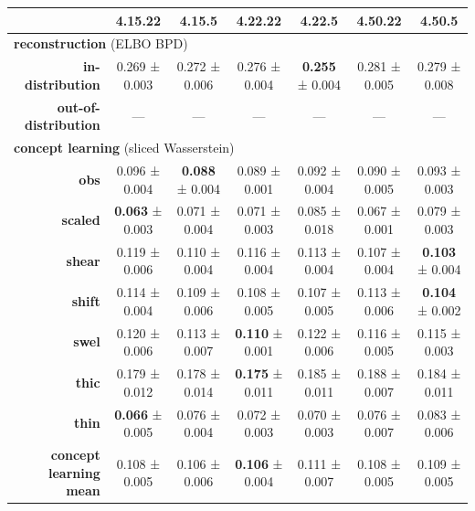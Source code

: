 \begin{tabular}{rcccccc}
\toprule
& \textbf{4.15.22} & \textbf{4.15.5} & \textbf{4.22.22} & \textbf{4.22.5} & \textbf{4.50.22} & \textbf{4.50.5} \\
\midrule
\multicolumn{ 7 }{l}{\textbf{reconstruction}  (ELBO BPD)} \\
\midrule
\textbf{in-distribution} & 0.269 ± 0.003 & 0.272 ± 0.006 & 0.276 ± 0.004 & \textbf{0.255} ± 0.004 & 0.281 ± 0.005 & 0.279 ± 0.008 \\
\textbf{out-of-distribution} & --- & --- & --- & --- & --- & --- \\
\midrule
\multicolumn{ 7 }{l}{\textbf{concept learning}  (sliced Wasserstein)} \\
\midrule
\textbf{obs} & 0.096 ± 0.004 & \textbf{0.088} ± 0.004 & 0.089 ± 0.001 & 0.092 ± 0.004 & 0.090 ± 0.005 & 0.093 ± 0.003 \\
\textbf{scaled} & \textbf{0.063} ± 0.003 & 0.071 ± 0.004 & 0.071 ± 0.003 & 0.085 ± 0.018 & 0.067 ± 0.001 & 0.079 ± 0.003 \\
\textbf{shear} & 0.119 ± 0.006 & 0.110 ± 0.004 & 0.116 ± 0.004 & 0.113 ± 0.004 & 0.107 ± 0.004 & \textbf{0.103} ± 0.004 \\
\textbf{shift} & 0.114 ± 0.004 & 0.109 ± 0.006 & 0.108 ± 0.005 & 0.107 ± 0.005 & 0.113 ± 0.006 & \textbf{0.104} ± 0.002 \\
\textbf{swel} & 0.120 ± 0.006 & 0.113 ± 0.007 & \textbf{0.110} ± 0.001 & 0.122 ± 0.006 & 0.116 ± 0.005 & 0.115 ± 0.003 \\
\textbf{thic} & 0.179 ± 0.012 & 0.178 ± 0.014 & \textbf{0.175} ± 0.011 & 0.185 ± 0.011 & 0.188 ± 0.007 & 0.184 ± 0.011 \\
\textbf{thin} & \textbf{0.066} ± 0.005 & 0.076 ± 0.004 & 0.072 ± 0.003 & 0.070 ± 0.003 & 0.076 ± 0.007 & 0.083 ± 0.006 \\
\addlinespace
\textbf{concept learning mean} & 0.108 ± 0.005 & 0.106 ± 0.006 & \textbf{0.106} ± 0.004 & 0.111 ± 0.007 & 0.108 ± 0.005 & 0.109 ± 0.005 \\
\midrule
\bottomrule
\end{tabular}
